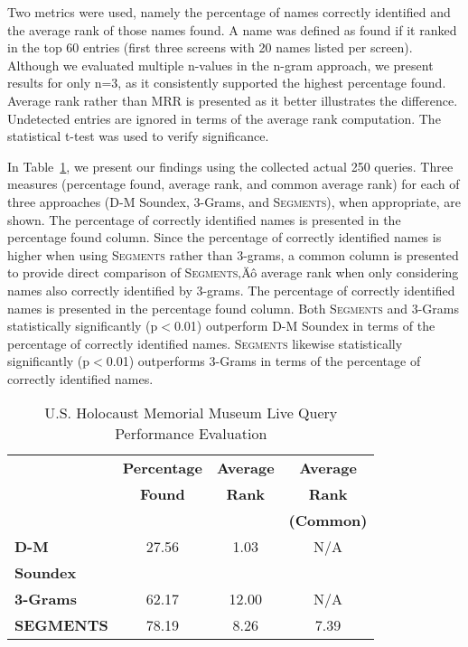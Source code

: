 \documentclass{endm}
\begin{document}
\begin{CJK}{UTF8}{song}
Two metrics were used, namely the percentage of names correctly identified and the average rank of those names found.  A name was defined as found if it ranked in the top 60 entries (first three screens with 20 names listed per screen). Although we evaluated multiple n-values in the n-gram approach, we present results for only n=3, as it consistently supported the highest percentage found.  Average rank rather than MRR is presented as it better illustrates the difference.  Undetected entries are ignored in terms of the average rank computation.  The statistical t-test was used to verify significance.


In Table~\ref{tab:query_performance}, we present our findings using the collected actual 250 queries.  Three measures (percentage found, average rank, and common average rank) for each of three approaches (D-M Soundex, 3-Grams, and S\textsc{egments}), when appropriate, are shown.  The percentage of correctly identified names is presented in the percentage found column.  Since the percentage of correctly identified names is higher when using S\textsc{egments} rather than 3-grams, a common column is presented to provide direct comparison of S\textsc{egments}‚Äô average rank when only considering names also correctly identified by 3-grams.  The percentage of correctly identified names is presented in the percentage found column. Both S\textsc{egments} and 3-Grams statistically significantly (p$<$0.01) outperform D-M Soundex in terms of the percentage of correctly identified names.  S\textsc{egments} likewise statistically significantly (p$<$0.01) outperforms 3-Grams in terms of the percentage of correctly identified names.  


\begin{table}
	\centering
	\caption{U.S. Holocaust Memorial Museum Live Query Performance Evaluation}
	\begin{tabular}{|l|c|c|c|}
		\hline
		 & \textbf{Percentage} & \textbf{Average} & \textbf{Average}\\
		 & \textbf{Found} & \textbf{Rank} & \textbf{Rank}  \\
		 & & & \textbf{(Common)} \\
		\hline
		\textbf{D-M} & 27.56 & 1.03 & N/A \\
		\textbf{Soundex} & & & \\
		\hline
		\textbf{3-Grams} & 62.17 & 12.00 & N/A \\
		\hline
		\textbf{SEGMENTS} & 78.19 & 8.26 & 7.39 \\
		\hline
	\end{tabular}
	\label{tab:query_performance}
\end{table}



\end{CJK}
\end{document}

